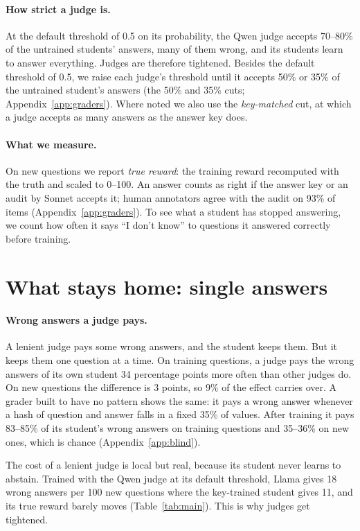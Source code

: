 \documentclass[11pt,a4paper,twocolumn]{article}
\newcommand{\idk}{``I don't know''}
\begin{document}
\paragraph{How strict a judge is.} At the default threshold of 0.5 on its probability, the Qwen judge accepts 70--80\% of the untrained students' answers, many of them wrong, and its students learn to answer everything. Judges are therefore tightened. Besides the default threshold of 0.5, we raise each judge's threshold until it accepts 50\% or 35\% of the untrained student's answers (the 50\% and 35\% cuts; Appendix~\ref{app:graders}). Where noted we also use the \emph{key-matched} cut, at which a judge accepts as many answers as the answer key does.

\paragraph{What we measure.} On new questions we report \emph{true reward}: the training reward recomputed with the truth and scaled to 0--100. An answer counts as right if the answer key or an audit by Sonnet accepts it; human annotators agree with the audit on 93\% of items (Appendix~\ref{app:graders}). To see what a student has stopped answering, we count how often it says \idk{} to questions it answered correctly before training.

\section{What stays home: single answers}
\label{sec:home}


\paragraph{Wrong answers a judge pays.} A lenient judge pays some wrong answers, and the student keeps them. But it keeps them one question at a time. On training questions, a judge pays the wrong answers of its own student 34 percentage points more often than other judges do. On new questions the difference is 3 points, so 9\% of the effect carries over. A grader built to have no pattern shows the same: it pays a wrong answer whenever a hash of question and answer falls in a fixed 35\% of values. After training it pays 83--85\% of its student's wrong answers on training questions and 35--36\% on new ones, which is chance (Appendix~\ref{app:blind}).

The cost of a lenient judge is local but real, because its student never learns to abstain. Trained with the Qwen judge at its default threshold, Llama gives 18 wrong answers per 100 new questions where the key-trained student gives 11, and its true reward barely moves (Table~\ref{tab:main}). This is why judges get tightened.
\end{document}
